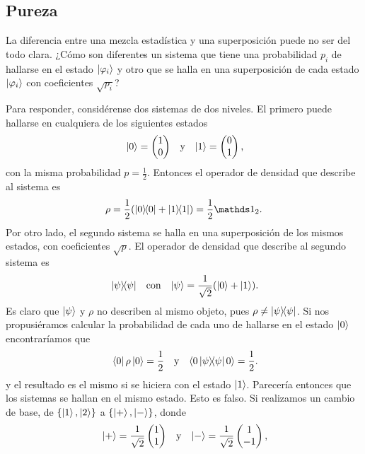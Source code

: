 \subsection{Pureza}

La diferencia entre una mezcla estadística y una superposición puede no ser del todo clara. ¿Cómo son diferentes un sistema que tiene una probabilidad $p_{i}$ de hallarse en el estado $\ket{\varphi_{i}}$ y otro que se halla en una superposición de cada estado $\ket{\varphi_{i}}$ con coeficientes $\sqrt{p_{i}}$? 

Para responder, considérense dos sistemas de dos niveles. El primero puede hallarse en cualquiera de los siguientes estados
\begin{align*}
    \ket{0}=\begin{pmatrix}
        1\\
        0
    \end{pmatrix} && \text{y} && \ket{1}=\begin{pmatrix}
        0\\
        1
    \end{pmatrix}\rlap{,}
\end{align*}
con la misma probabilidad $p=\frac{1}{2}$. Entonces el operador de densidad que describe al sistema es 
\begin{equation*}
    \rho=\frac{1}{2}(\dyad{0}+\dyad{1})=\frac{1}{2}\Id_{2}.
\end{equation*}
Por otro lado, el segundo sistema se halla en una superposición de los mismos estados, con coeficientes $\sqrt{p}$. El operador de densidad que describe al segundo sistema es 
\begin{align*}
    \dyad{\psi} && \text{con} && \ket{\psi}=\frac{1}{\sqrt{2}}(\ket{0}+\ket{1})\rlap{.}
\end{align*}
Es claro que $\ket{\psi}$ y $\rho$ no describen al mismo objeto, pues $\rho\neq\dyad{\psi}$. Si nos propusiéramos calcular la probabilidad de cada uno de hallarse en el estado $\ket{0}$ encontraríamos que
\begin{align*}
    \bra{0}\rho\ket{0}=\frac{1}{2} && \text{y} &&\langle 0 \dyad{\psi} 0\rangle=\frac{1}{2}\rlap{.}
\end{align*}
y el resultado es el mismo si se hiciera con el estado $\ket{1}$. Parecería entonces que los sistemas se hallan en el mismo estado. Esto es falso. Si realizamos un cambio de base, de $\{\ket{1},\ket{2}\}$ a $\{\ket{+},\ket{-}\}$, donde
\begin{align*}
    \ket{+}=\frac{1}{\sqrt{2}}\begin{pmatrix}
        1\\
        1
    \end{pmatrix} && \text{y} && \ket{-}=\frac{1}{\sqrt{2}}\begin{pmatrix}
        1\\
        -1
    \end{pmatrix}\rlap{,}
\end{align*}
